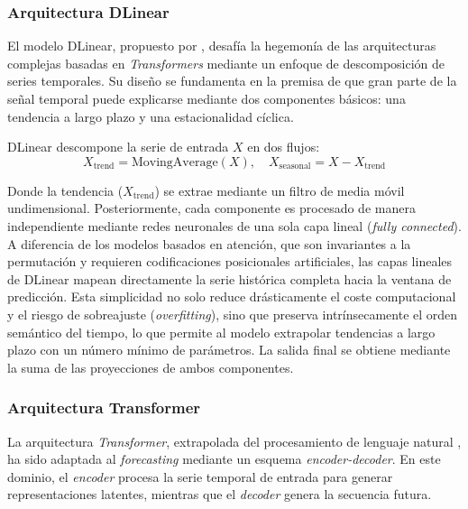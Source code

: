 \subsubsection{Arquitectura DLinear}

El modelo DLinear, propuesto por \textcite{zeng2023are}, desafía la hegemonía de las arquitecturas complejas basadas en \textit{Transformers} mediante un enfoque de descomposición de series temporales. Su diseño se fundamenta en la premisa de que gran parte de la señal temporal puede explicarse mediante dos componentes básicos: una tendencia a largo plazo y una estacionalidad cíclica.

DLinear descompone la serie de entrada $X$ en dos flujos:
\begin{equation}
	X_{\text{trend}} = \text{MovingAverage}(X), \quad X_{\text{seasonal}} = X - X_{\text{trend}}
\end{equation}

Donde la tendencia ($X_{\text{trend}}$) se extrae mediante un filtro de media móvil undimensional. Posteriormente, cada componente es procesado de manera independiente mediante redes neuronales de una sola capa lineal (\textit{fully connected}). A diferencia de los modelos basados en atención, que son invariantes a la permutación y requieren codificaciones posicionales artificiales, las capas lineales de DLinear mapean directamente la serie histórica completa hacia la ventana de predicción. Esta simplicidad no solo reduce drásticamente el coste computacional y el riesgo de sobreajuste (\textit{overfitting}), sino que preserva intrínsecamente el orden semántico del tiempo, lo que permite al modelo extrapolar tendencias a largo plazo con un número mínimo de parámetros. La salida final se obtiene mediante la suma de las proyecciones de ambos componentes.

\subsubsection{Arquitectura Transformer}

La arquitectura \textit{Transformer}, extrapolada del procesamiento de lenguaje natural \parencite{vaswani2017attention}, ha sido adaptada al \textit{forecasting} mediante un esquema \textit{encoder-decoder}. En este dominio, el \textit{encoder} procesa la serie temporal de entrada para generar representaciones latentes, mientras que el \textit{decoder} genera la secuencia futura. 

